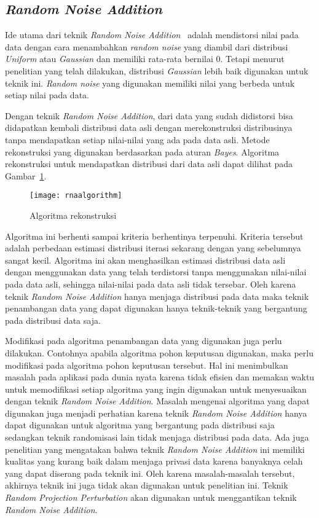 \subsection{\textit{Random Noise Addition}}
\label{subsec:rna}

Ide utama dari teknik \textit{Random Noise Addition}~\cite{agrawalsrikant:00:randomnoise} adalah mendistorsi nilai pada data dengan cara menambahkan \textit{random noise} yang diambil dari distribusi \textit{Uniform} atau \textit{Gaussian} dan memiliki rata-rata bernilai 0. Tetapi menurut penelitian yang telah dilakukan, distribusi \textit{Gaussian} lebih baik digunakan untuk teknik ini. \textit{Random noise} yang digunakan memiliki nilai yang berbeda untuk setiap nilai pada data.

Dengan teknik \textit{Random Noise Addition}, dari data yang sudah didistorsi bisa didapatkan kembali distribusi data asli dengan merekonstruksi distribusinya tanpa mendapatkan setiap nilai-nilai yang ada pada data asli. Metode rekonstruksi yang digunakan berdasarkan pada aturan \textit{Bayes}. Algoritma rekonstruksi untuk mendapatkan distribusi dari data asli dapat dilihat pada Gambar~\ref{fig:rnaalgorithm}.

\begin{figure}
	\centering
	\texttt{[image: rnaalgorithm]}
	\caption{Algoritma rekonstruksi}
	\label{fig:rnaalgorithm}
\end{figure}

Algoritma ini berhenti sampai kriteria berhentinya terpenuhi. Kriteria tersebut adalah perbedaan estimasi distribusi iterasi sekarang dengan yang sebelumnya sangat kecil. Algoritma ini akan menghasilkan estimasi distribusi data asli dengan menggunakan data yang telah terdistorsi tanpa menggunakan nilai-nilai pada data asli, sehingga nilai-nilai pada data asli tidak tersebar. Oleh karena teknik \textit{Random Noise Addition} hanya menjaga distribusi pada data maka teknik penambangan data yang dapat digunakan hanya teknik-teknik yang bergantung pada distribusi data saja.

Modifikasi pada algoritma penambangan data yang digunakan juga perlu dilakukan. Contohnya apabila algoritma pohon keputusan digunakan, maka perlu modifikasi pada algoritma pohon keputusan tersebut. Hal ini menimbulkan masalah pada aplikasi pada dunia nyata karena tidak efisien dan memakan waktu untuk memodifikasi setiap algoritma yang ingin digunakan untuk menyesuaikan dengan teknik \textit{Random Noise Addition}. Masalah mengenai algoritma yang dapat digunakan juga menjadi perhatian karena teknik \textit{Random Noise Addition} hanya dapat digunakan untuk algoritma yang bergantung pada distribusi saja sedangkan teknik randomisasi lain tidak menjaga distribusi pada data. Ada juga penelitian yang mengatakan bahwa teknik \textit{Random Noise Addition} ini memiliki kualitas yang kurang baik dalam menjaga privasi data karena banyaknya celah yang dapat diserang pada teknik ini. Oleh karena masalah-masalah tersebut, akhirnya teknik ini juga tidak akan digunakan untuk penelitian ini. Teknik \textit{Random Projection Perturbation} akan digunakan untuk menggantikan teknik \textit{Random Noise Addition}.

